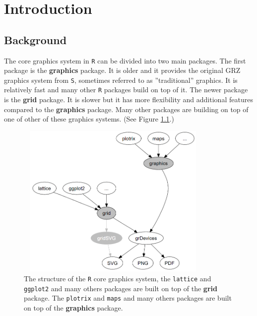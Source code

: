 \documentclass[11pt,twoside]{report}
\begin{document}
\tableofcontents
\listoffigures





\chapter{Introduction}
\section{Background}
The core graphics system in \texttt{R} \citep{R2017} can be divided into two main packages. The first package is the \textbf{graphics} package. It is older and it provides the original GRZ graphics system from \texttt{S}, sometimes referred to as ''traditional'' graphics. It is relatively fast and many other \texttt{R} packages build on top of it. The newer package is the \textbf{grid} package. It is slower but it has more flexibility and additional features compared to the \textbf{graphics} package. Many other packages are building on top of one of other of these graphics systems. (See Figure \ref{intro}.) \\

\begin{figure}[h]
	\begin{center}
		\includegraphics[height = 7.5cm, width = 9.5cm]{figure/intro.png}
		\caption{The structure of the \texttt{R} core graphics system, the \texttt{lattice} \citep{lattice}  and \texttt{ggplot2} \citep{ggplot2} and many others packages are built on top of the \textbf{grid} package. The \texttt{plotrix} \citep{plotrix} and \texttt{maps} \citep{maps} and many others packages are built on top of the \textbf{graphics} package. }
		\label{intro}
	\end{center}
\end{figure}
\end{document}
